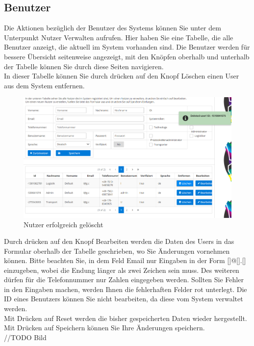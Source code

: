 \documentclass[enabledeprecatedfontcommands,fontsize=12pt,paper=a4,twoside]{scrartcl}
\begin{document}
\subsection{Benutzer}
Die Aktionen bezüglich der Benutzer des Systems können Sie unter dem Unterpunkt Nutzer Verwalten aufrufen. 
Hier haben Sie eine Tabelle, die alle Benutzer anzeigt, die aktuell im System vorhanden sind. Die Benutzer werden für bessere Übersicht seitenweise angezeigt, mit den Knöpfen oberhalb und unterhalb der Tabelle können Sie durch diese Seiten navigieren.\\
 In dieser Tabelle können Sie durch drücken auf den Knopf Löschen einen User aus dem System entfernen.  
\begin{figure}[h!]
\begin{center}
 \includegraphics[width=\textwidth]{screenshots/admin/nutzerloeschen.png}
  \caption{Nutzer erfolgreich gelöscht}
  \label{fig:boat2}
\end{center}
\end{figure}
Durch drücken auf den Knopf Bearbeiten werden die Daten des Users in das Formular oberhalb der Tabelle geschrieben, wo Sie Änderungen vornehmen können. 
Bitte beachten Sie, in dem Feld Email nur Eingaben in der Form []@[].[] einzugeben, wobei die Endung länger als zwei Zeichen sein muss. Des weiteren dürfen für die Telefonnummer nur Zahlen eingegeben werden. Sollten Sie Fehler in den Eingaben machen, werden Ihnen die fehlerhaften Felder rot unterlegt. Die ID eines Benutzers können Sie nicht bearbeiten, da diese vom System verwaltet werden. \\
Mit Drücken auf Reset werden die bisher gespeicherten Daten wieder hergestellt. Mit Drücken auf Speichern können Sie Ihre Änderungen speichern. \\
//TODO Bild
\end{document}
